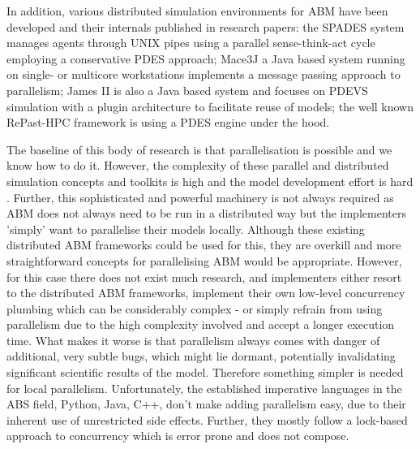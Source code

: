 In addition, various distributed simulation environments for ABM have been developed and their internals published in research papers: the SPADES system \cite{riley_next_2003} manages agents through UNIX pipes using a parallel sense-think-act cycle employing a conservative PDES approach; Mace3J \cite{gasser_mace3j:_2002} a Java based system running on single- or multicore workstations implements a message passing approach to parallelism; James II \cite{himmelspach_plugn_2007} is also a Java based system and focuses on PDEVS simulation with a plugin architecture to facilitate reuse of models; the well known RePast-HPC \cite{minson_distributing_2008, gorur_repast_2016} framework is using a PDES engine under the hood. 

The baseline of this body of research is that parallelisation is possible and we know how to do it. However, the complexity of these parallel and distributed simulation concepts and toolkits is high and the model development effort is hard \cite{abar_agent_2017}. Further, this sophisticated and powerful machinery is not always required as ABM does not always need to be run in a distributed way but the implementers 'simply' want to parallelise their models locally. Although these existing distributed ABM frameworks could be used for this, they are overkill and more straightforward concepts for parallelising ABM would be appropriate. However, for this case there does not exist much research, and implementers either resort to the distributed ABM frameworks, implement their own low-level concurrency plumbing which can be considerably complex - or simply refrain from using parallelism due to the high complexity involved and accept a longer execution time. What makes it worse is that parallelism always comes with danger of additional, very subtle bugs, which might lie dormant, potentially invalidating significant scientific results of the model. Therefore something simpler is needed for local parallelism. Unfortunately, the established imperative languages in the ABS field, Python, Java, C++, don't make adding parallelism easy, due to their inherent use of unrestricted side effects. Further, they mostly follow a lock-based approach to concurrency which is error prone and does not compose. %

\medskip


